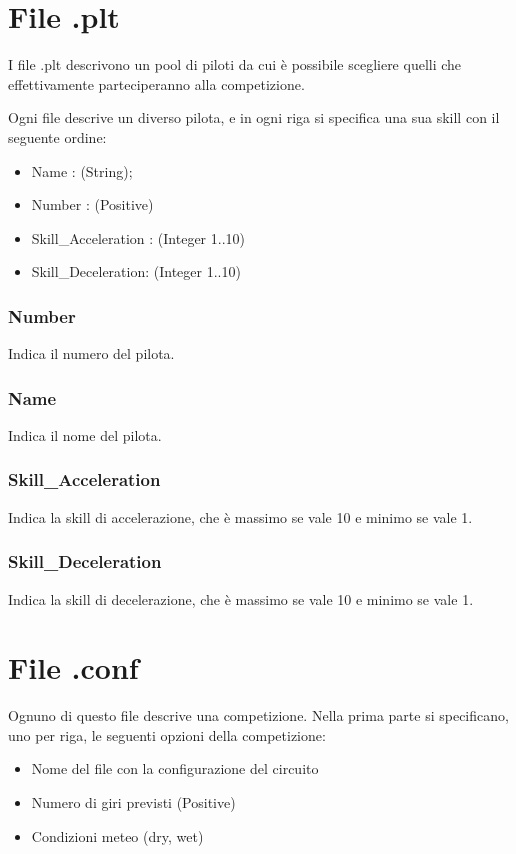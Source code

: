 \documentclass[a4paper,11pt, twoside]{book}
\begin{document}
      \section{File .plt}
	I file .plt descrivono un pool di piloti da cui è possibile scegliere quelli che effettivamente parteciperanno alla
	competizione.
	
	Ogni file descrive un diverso pilota, e in ogni riga si specifica una sua skill con il seguente ordine:
	
	\begin{itemize}
	  \item Name : (String);
	  \item Number : (Positive)
	  \item Skill\_Acceleration : (Integer 1..10)
	  \item Skill\_Deceleration: (Integer 1..10)
	\end{itemize}

	\subsubsection{Number}
	  Indica il numero del pilota.

	\subsubsection{Name}
	  Indica il nome del pilota.

	\subsubsection{Skill\_Acceleration}
	  Indica la skill di accelerazione, che è massimo se vale 10 e minimo se vale 1.

	\subsubsection{Skill\_Deceleration}
	  Indica la skill di decelerazione, che è massimo se vale 10 e minimo se vale 1.
	  
      \section{File .conf}
	Ognuno di questo file descrive una competizione. Nella prima parte si specificano, uno per riga,
	le seguenti opzioni della competizione:
	
	\begin{itemize}
	  \item Nome del file con la configurazione del circuito
	  \item Numero di giri previsti (Positive)
	  \item Condizioni meteo (dry, wet)
	\end{itemize}
	
\end{document}
